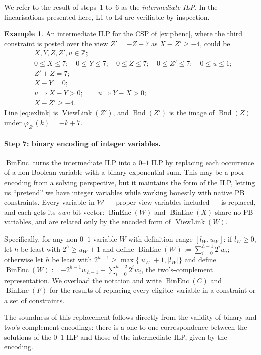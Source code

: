 \documentclass[11pt,a4paper]{article}
\theoremstyle{plain}
\theoremstyle{definition}
\newtheorem{exampleT}{Example}
\theoremstyle{remark}
\newcommand{\fname}[1]{\ensuremath{\operatorname{#1}}}
\newcommand{\BinEnc}{\fname{BinEnc}}
\newcommand{\Bnd}{\fname{Bnd}}
\newcommand{\ViewLink}{\fname{ViewLink}}
\begin{document}
We refer to the result of steps~1 to~6 as the \emph{intermediate ILP}.  In the
linearisations presented here, L1 to L4 are verifiable by inspection.

\begin{exampleT}
An intermediate ILP for the CSP of \cref{ex:pbenc}, where the third constraint
is posted over the view $Z' = -Z + 7$ as $X - Z' \geq -4$, could be
\begin{align}
  &X,Y,Z,Z',u\in\mathbb Z ;\\
  &0\leq X\leq 7;\quad 0\leq Y\leq 7;\quad 0\leq Z\leq 7;\quad
    0\leq Z'\leq 7;\quad 0\leq u\leq 1;\\
  &Z' + Z = 7; \label{eq:exlink}\\
  &X - Y = 0;\\
  &u \Rightarrow X - Y > 0; \qquad \bar u \Rightarrow Y - X > 0;\\
  &X - Z' \geq -4 .
\end{align}
Line \cref{eq:exlink} is $\ViewLink(Z')$, and $\Bnd(Z')$ is the image of
$\Bnd(Z)$ under $\varphi_{Z'}(k) = -k+7$.
\end{exampleT}

\paragraph{Step 7: binary encoding of integer variables.}
$\BinEnc$ turns the intermediate ILP into a $0$--$1$ ILP by replacing each
occurrence of a non-Boolean variable with a binary exponential sum.  This may
be a poor encoding from a solving perspective, but it maintains the form of the
ILP, letting us ``pretend'' we have integer variables while working honestly
with native PB constraints.  Every variable in $\mathcal W$ --- proper
view variables included --- is replaced, and each gets its \emph{own} bit
vector: $\BinEnc(W)$ and $\BinEnc(X)$ share no PB variables, and are related
only by the encoded form of $\ViewLink(W)$.

Specifically, for any non-$0$--$1$ variable $W$ with definition range
$[l_W,u_W]$: if $l_W\geq 0$, let $h$ be least with $2^h\geq u_W+1$ and define
$\BinEnc(W) := \sum_{i=0}^{h-1}2^i w_i$; otherwise let $h$ be least with
$2^{h-1}\geq \max\{|u_W|+1,|l_W|\}$ and define
$\BinEnc(W) := -2^{h-1}w_{h-1}+\sum_{i=0}^{h-2}2^i w_i$, the two's-complement
representation.  We overload the notation and write $\BinEnc(C)$ and
$\BinEnc(F)$ for the results of replacing every eligible variable in a
constraint or a set of constraints.

The soundness of this replacement follows directly from the validity of binary
and two's-complement encodings: there is a one-to-one correspondence between
the solutions of the $0$--$1$ ILP and those of the intermediate ILP, given by
the encoding.
\end{document}
